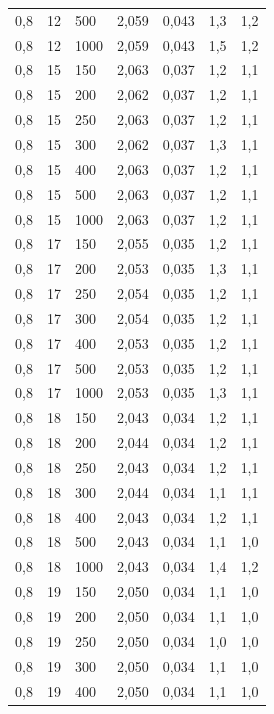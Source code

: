 \begin{tabular}{lllllll}
        0,8 & 12 & 500 & 2,059 & 0,043 & 1,3 & 1,2 \\ 
        0,8 & 12 & 1000 & 2,059 & 0,043 & 1,5 & 1,2 \\ 
        0,8 & 15 & 150 & 2,063 & 0,037 & 1,2 & 1,1 \\ 
        0,8 & 15 & 200 & 2,062 & 0,037 & 1,2 & 1,1 \\ 
        0,8 & 15 & 250 & 2,063 & 0,037 & 1,2 & 1,1 \\ 
        0,8 & 15 & 300 & 2,062 & 0,037 & 1,3 & 1,1 \\ 
        0,8 & 15 & 400 & 2,063 & 0,037 & 1,2 & 1,1 \\ 
        0,8 & 15 & 500 & 2,063 & 0,037 & 1,2 & 1,1 \\ 
        0,8 & 15 & 1000 & 2,063 & 0,037 & 1,2 & 1,1 \\ 
        0,8 & 17 & 150 & 2,055 & 0,035 & 1,2 & 1,1 \\ 
        0,8 & 17 & 200 & 2,053 & 0,035 & 1,3 & 1,1 \\ 
        0,8 & 17 & 250 & 2,054 & 0,035 & 1,2 & 1,1 \\ 
        0,8 & 17 & 300 & 2,054 & 0,035 & 1,2 & 1,1 \\ 
        0,8 & 17 & 400 & 2,053 & 0,035 & 1,2 & 1,1 \\ 
        0,8 & 17 & 500 & 2,053 & 0,035 & 1,2 & 1,1 \\ 
        0,8 & 17 & 1000 & 2,053 & 0,035 & 1,3 & 1,1 \\ 
        0,8 & 18 & 150 & 2,043 & 0,034 & 1,2 & 1,1 \\ 
        0,8 & 18 & 200 & 2,044 & 0,034 & 1,2 & 1,1 \\ 
        0,8 & 18 & 250 & 2,043 & 0,034 & 1,2 & 1,1 \\ 
        0,8 & 18 & 300 & 2,044 & 0,034 & 1,1 & 1,1 \\ 
        0,8 & 18 & 400 & 2,043 & 0,034 & 1,2 & 1,1 \\ 
        0,8 & 18 & 500 & 2,043 & 0,034 & 1,1 & 1,0 \\ 
        0,8 & 18 & 1000 & 2,043 & 0,034 & 1,4 & 1,2 \\ 
        0,8 & 19 & 150 & 2,050 & 0,034 & 1,1 & 1,0 \\ 
        0,8 & 19 & 200 & 2,050 & 0,034 & 1,1 & 1,0 \\ 
        0,8 & 19 & 250 & 2,050 & 0,034 & 1,0 & 1,0 \\ 
        0,8 & 19 & 300 & 2,050 & 0,034 & 1,1 & 1,0 \\ 
        0,8 & 19 & 400 & 2,050 & 0,034 & 1,1 & 1,0 \\ 

\end{tabular}
